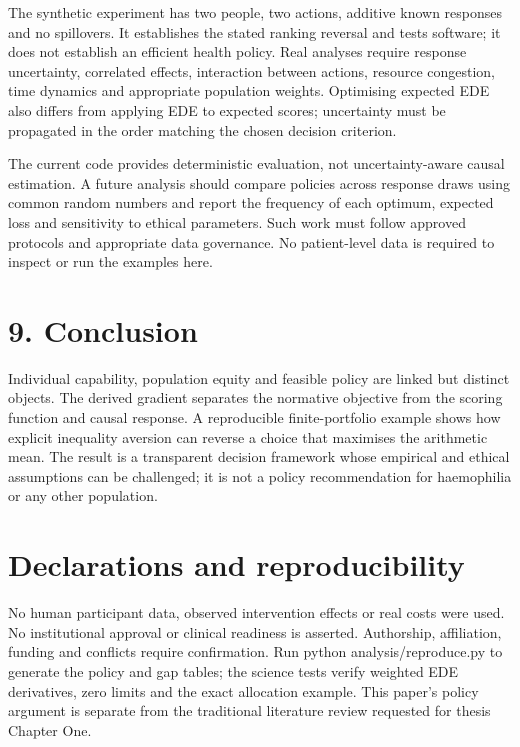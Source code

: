 \documentclass[11pt,a4paper]{article}
\begin{document}
The synthetic experiment has two people, two actions, additive known responses and no spillovers. It establishes the stated ranking reversal and tests software; it does not establish an efficient health policy. Real analyses require response uncertainty, correlated effects, interaction between actions, resource congestion, time dynamics and appropriate population weights. Optimising expected EDE also differs from applying EDE to expected scores; uncertainty must be propagated in the order matching the chosen decision criterion.

The current code provides deterministic evaluation, not uncertainty-aware causal estimation. A future analysis should compare policies across response draws using common random numbers and report the frequency of each optimum, expected loss and sensitivity to ethical parameters. Such work must follow approved protocols and appropriate data governance. No patient-level data is required to inspect or run the examples here.

\section*{9. Conclusion}
Individual capability, population equity and feasible policy are linked but distinct objects. The derived gradient separates the normative objective from the scoring function and causal response. A reproducible finite-portfolio example shows how explicit inequality aversion can reverse a choice that maximises the arithmetic mean. The result is a transparent decision framework whose empirical and ethical assumptions can be challenged; it is not a policy recommendation for haemophilia or any other population.

\section*{Declarations and reproducibility}
No human participant data, observed intervention effects or real costs were used. No institutional approval or clinical readiness is asserted. Authorship, affiliation, funding and conflicts require confirmation. Run python analysis/reproduce.py to generate the policy and gap tables; the science tests verify weighted EDE derivatives, zero limits and the exact allocation example. This paper's policy argument is separate from the traditional literature review requested for thesis Chapter One.
\end{document}
